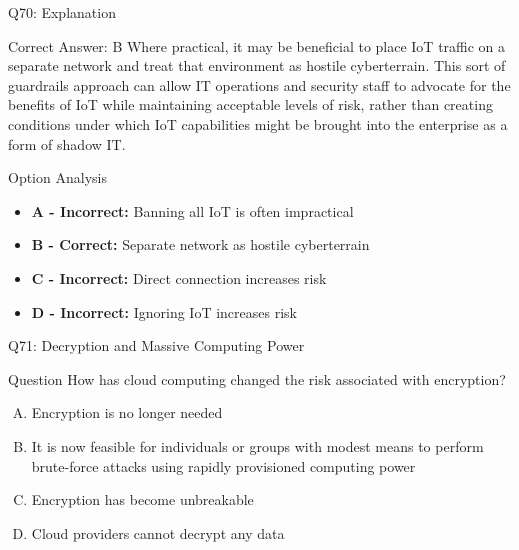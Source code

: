 \documentclass{beamer}
\begin{document}
	\begin{frame}{Q70: Explanation}
		\begin{block}{Correct Answer: B}
			Where practical, it may be beneficial to place IoT traffic on a separate network and treat that environment as hostile cyberterrain. This sort of guardrails approach can allow IT operations and security staff to advocate for the benefits of IoT while maintaining acceptable levels of risk, rather than creating conditions under which IoT capabilities might be brought into the enterprise as a form of shadow IT.
		\end{block}
		\begin{block}{Option Analysis}
			\begin{itemize}
				\item \textbf{A - Incorrect:} Banning all IoT is often impractical
				\item \textbf{B - Correct:} Separate network as hostile cyberterrain
				\item \textbf{C - Incorrect:} Direct connection increases risk
				\item \textbf{D - Incorrect:} Ignoring IoT increases risk
			\end{itemize}
		\end{block}
	\end{frame}
	
	\begin{frame}{Q71: Decryption and Massive Computing Power}
		\begin{block}{Question}
			How has cloud computing changed the risk associated with encryption?
		\end{block}
		\begin{enumerate}[(A)]
			\item Encryption is no longer needed
			\item It is now feasible for individuals or groups with modest means to perform brute-force attacks using rapidly provisioned computing power
			\item Encryption has become unbreakable
			\item Cloud providers cannot decrypt any data
		\end{enumerate}
	\end{frame}
	
\end{document}
